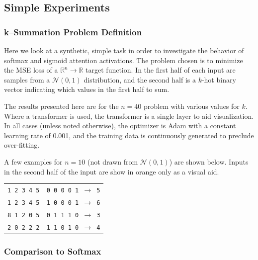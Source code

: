 \subsection{Simple Experiments}
\label{sec:appendix_simple_experiments}

\subsubsection{k--Summation Problem Definition}
\label{sec:a_se_prob_def}

Here we look at a synthetic, simple task in order to investigate the behavior of softmax and sigmoid attention activations.  The problem chosen is to minimize the MSE loss of a $\mathbb{R}^{n} \rightarrow \mathbb{R}$ target function.  In the first half of each input are samples from a $\mathcal{N}(0,1)$ distribution, and the second half is a $k$-hot binary vector indicating which values in the first half to sum.  

The results presented here are for the $n=40$ problem with various values for $k$.  Where a transformer is used, the transformer is a single layer to aid visualization.  In all cases (unless noted otherwise), the optimizer is Adam with a constant learning rate of 0.001, and the training data is continuously generated to preclude over-fitting.

A few examples for $n=10$ (not drawn from $\mathcal{N}(0,1)$) are shown below.  Inputs in the second half of the input are show in {\color{orange} orange} only as a visual aid.

\begin{table}[h]
    \centering
    \begin{tabular}{c}
        \texttt{1 2 3 4 5 {\color{orange} 0 0 0 0 1 }$\rightarrow$ 5} \\
        \texttt{1 2 3 4 5 {\color{orange} 1 0 0 0 1 }$\rightarrow$ 6} \\
        \texttt{8 1 2 0 5 {\color{orange} 0 1 1 1 0 }$\rightarrow$ 3} \\
        \texttt{2 0 2 2 2 {\color{orange} 1 1 0 1 0 }$\rightarrow$ 4} \\
    \end{tabular}
    \label{tab:k_sum_examples}
\end{table}

\subsubsection{Comparison to Softmax}
\label{sec:a_se_compare}

